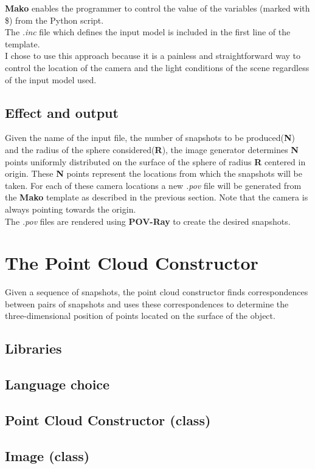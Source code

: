 \documentclass[12pt,a4paper,twoside,openright]{report}
\begin{document}
\textbf{Mako} enables the programmer to control the value of the variables (marked with \$) from the Python script. \\
The \textit{.inc} file which defines the input model is included in the first line of the template. \\
I chose to use this approach because it is a painless and straightforward way to control the location of the camera and the light conditions of the scene regardless of the input model used. 

\subsection{Effect and output}
Given the name of the input file, the number of snapshots to be produced(\textbf{N}) and the radius of the sphere considered(\textbf{R}), the image generator determines \textbf{N} points uniformly distributed on the surface of the sphere of radius \textbf{R} centered in origin. These \textbf{N} points represent the locations from which the snapshots will be taken. For each of these camera locations a new \textit{.pov} file will be generated from the \textbf{Mako} template as described in the previous section. Note that the camera is always pointing towards the origin. \\
The \textit{.pov} files are rendered using \textbf{POV-Ray} to create the desired snapshots.

\section{The Point Cloud Constructor}
Given a sequence of snapshots, the point cloud constructor finds correspondences between pairs of snapshots and uses these correspondences to determine the three-dimensional position of points located on the surface of the object.   
\subsection{Libraries}
\subsection{Language choice}
\subsection{Point Cloud Constructor (class)}
\subsection{Image (class)}
\end{document}

